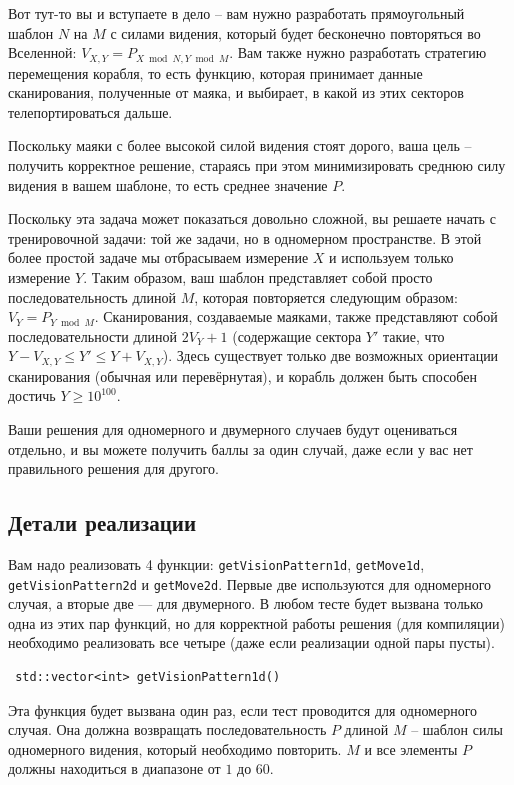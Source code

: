 \documentclass[12pt]{article}
\begin{document}
Вот тут-то вы и вступаете в дело -- вам нужно разработать прямоугольный шаблон $N$ на $M$ с силами видения, который будет бесконечно повторяться во Вселенной: $V_{X, Y} = P_{X \bmod N, Y \bmod M}$. Вам также нужно разработать стратегию перемещения корабля, то есть функцию, которая принимает данные сканирования, полученные от маяка, и выбирает, в какой из этих секторов телепортироваться дальше.

Поскольку маяки с более высокой силой видения стоят дорого, ваша цель -- получить корректное решение, стараясь при этом минимизировать среднюю силу видения в вашем шаблоне, то есть среднее значение $P$.

Поскольку эта задача может показаться довольно сложной, вы решаете начать с тренировочной задачи: той же задачи, но в одномерном пространстве. В этой более простой задаче мы отбрасываем измерение $X$ и используем только измерение $Y$. Таким образом, ваш шаблон представляет собой просто последовательность длиной $M$, которая повторяется следующим образом: $V_Y = P_{Y \bmod M}$. Сканирования, создаваемые маяками, также представляют собой последовательности длиной $2V_Y + 1$ (содержащие сектора $Y'$ такие, что $Y - V_{X, Y} \leq Y' \leq Y + V_{X, Y}$). Здесь существует только две возможных ориентации сканирования (обычная или перевёрнутая), и корабль должен быть способен достичь $Y \geq 10^{100}$.

Ваши решения для одномерного и двумерного случаев будут оцениваться отдельно, и вы можете получить баллы за один случай, даже если у вас нет правильного решения для другого.

\subsection{Детали реализации}

Вам надо реализовать 4 функции: \verb|getVisionPattern1d|, \verb|getMove1d|, \verb|getVisionPattern2d| и \verb|getMove2d|. Первые две используются для одномерного случая, а вторые две — для двумерного. В любом тесте будет вызвана только одна из этих пар функций, но для корректной работы решения (для компиляции) необходимо реализовать все четыре (даже если реализации одной пары пусты).

\begin{lstlisting}
 std::vector<int> getVisionPattern1d()
\end{lstlisting}

Эта функция будет вызвана один раз, если тест проводится для одномерного случая. Она должна возвращать последовательность $P$ длиной $M$ -- шаблон силы одномерного видения, который необходимо повторить. $M$ и все элементы $P$ должны находиться в диапазоне от $1$ до $60$.
\end{document}
